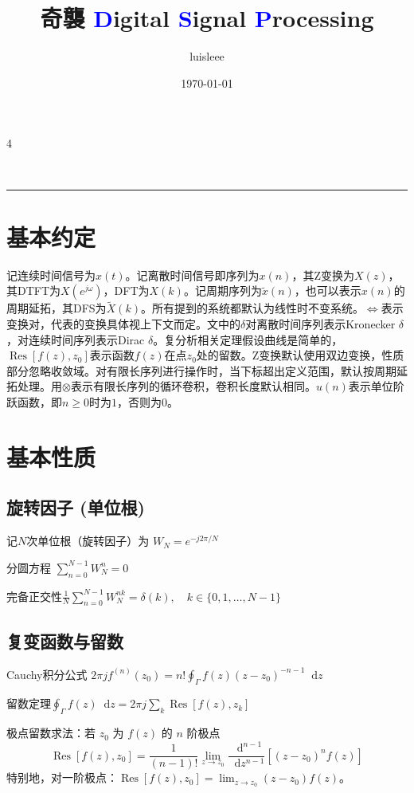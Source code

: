 \documentclass[8pt, a4paper]{extarticle}
\title{奇襲 \textcolor{blue}{D}igital \textcolor{blue}{S}ignal \textcolor{blue}{P}rocessing \ding{43}}
\author{luisleee}
\date{\today}
\makeatletter
\newcommand*{\dif}{\mathop{}\!\mathrm{d}}
\DeclareMathOperator{\Res}{Res}
\renewcommand{\maketitle}{
  \begin{center}
    \vspace{-2.5em} 
    
    {\Large \bfseries \@title} \\[0.4ex] 
    
    {\scriptsize \@author \quad \text{|} \quad \@date} 
    
    \vspace{0.2ex}
    \hrule 
    
    \vspace{-1.0em} 
  \end{center}
}
\makeatother
\begin{document}
\small
\begin{multicols}{4}

\maketitle
\section{基本约定}
记连续时间信号为\(x(t)\)。记离散时间信号即序列为\(x(n)\)，其Z变换为\(X(z)\)，其DTFT为\(X(e^{j\omega})\)，DFT为\(X(k)\)。记周期序列为\(\tilde{x}(n)\)，也可以表示\(x(n)\)的周期延拓，其DFS为\(\tilde{X}(k)\)。所有提到的系统都默认为线性时不变系统。\(\Leftrightarrow\)表示变换对，代表的变换具体视上下文而定。文中的\(\delta\)对离散时间序列表示Kronecker \(\delta\)，对连续时间序列表示Dirac \(\delta\)。复分析相关定理假设曲线是简单的，\(\Res[f(z),z_0]\)表示函数\(f(z)\)在点\(z_0\)处的留数。Z变换默认使用双边变换，性质部分忽略收敛域。对有限长序列进行操作时，当下标超出定义范围，默认按周期延拓处理。用\(\otimes\)表示有限长序列的循环卷积，卷积长度默认相同。\(u(n)\)表示单位阶跃函数，即\(n\geq 0\)时为\(1\)，否则为\(0\)。
\section{基本性质}

\subsection{旋转因子 (单位根)}
记\(N\)次单位根（旋转因子）为 \(W_N = e^{-j2\pi/N}\)

分圆方程 \(\sum_{n=0}^{N-1}W_N^n = 0\)

完备正交性\(\frac{1}{N}\sum_{n=0}^{N-1}W_N^{nk} = \delta(k),\quad k\in \{0,1,\ldots,N-1 \}\)

\subsection{复变函数与留数}
Cauchy积分公式
\( 2\pi j f^{(n)}(z_0) = n! \oint_\Gamma {f(z)(z - z_0)}^{-n-1}\dif z \)

留数定理\(\oint_\Gamma f(z)\dif z = 2\pi j \sum_k \Res[f(z), z_k]\)

极点留数求法：若 \(z_0\) 为 \(f(z)\) 的 \(n\) 阶极点
\[ \Res[f(z), z_0] = \frac{1}{(n-1)!} \lim_{z \to z_0} \frac{\dif^{n-1}}{\dif z^{n-1}} \left[ (z - z_0)^n f(z) \right] \]
特别地，对一阶极点：\(\Res[f(z), z_0] = \lim_{z \to z_0} (z - z_0) f(z)\)。


\end{multicols}
\end{document}
